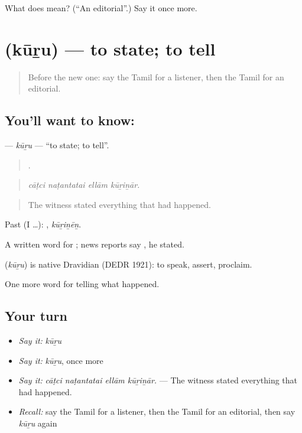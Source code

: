 \begin{tcolorbox}[breakable,colback=teal!4,colframe=teal!35!black,title={Before you move on}]
What does  mean? (\textquotedblleft{}An editorial\textquotedblright{}.) Say it once more.
\end{tcolorbox}
\section[\texorpdfstring{\ta{கூறு} (kūṟu)}{கூறு (kūṟu)}]{ (kūṟu) — to state; to tell}

\label{lesson:TA-C309-kuru}



\begin{quote}
Before the new one: say the Tamil for a listener, then the Tamil for an editorial.
\end{quote}

\subsection*{You'll want to know: }
\textbf{} — \emph{kūṟu} — \textquotedblleft{}to state; to tell\textquotedblright{}.

\begin{quote}
   .
\end{quote}

\begin{quote}
\emph{cāṭci naṭantatai ellām kūṟiṉār.}
\end{quote}

\begin{quote}
The witness stated everything that had happened.
\end{quote}

Past (I …): , \emph{kūṟiṉēṉ}.

A written word for ; news reports say , he stated.

\begin{cousinweb}
\textbf{} (\emph{kūṟu}) is native Dravidian (DEDR 1921): to speak, assert, proclaim.
\end{cousinweb}

\begin{grammarlens}[title={What you've built}]
One more word for telling what happened.
\end{grammarlens}

\subsection*{Your turn}
\begin{itemize}
\raggedright
  \item \emph{Say it:} \emph{kūṟu}
  \item \emph{Say it:} \emph{kūṟu}, once more
  \item \emph{Say it:} \emph{cāṭci naṭantatai ellām kūṟiṉār.} — The witness stated everything that had happened.
  \item \emph{Recall:} say the Tamil for a listener, then the Tamil for an editorial, then say \emph{kūṟu} again
\end{itemize}

